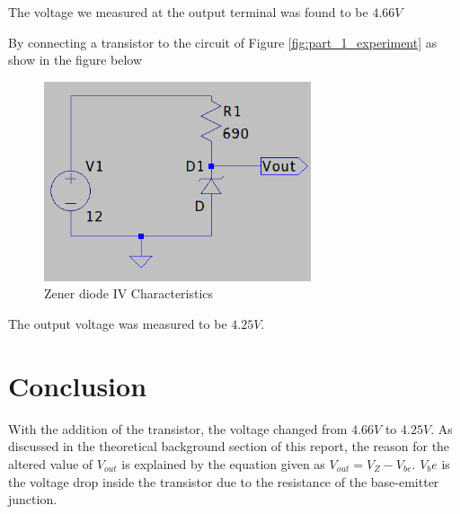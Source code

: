 \documentclass[12pt, a4paper]{article}
\begin{document}
		The voltage we measured at the output terminal was found to be $4.66V$

		By connecting a transistor to the circuit of Figure \ref{fig:part_1_experiment} as show in the figure below 

		\begin{figure}[H]
			\centering
			\includegraphics[width=0.7\textwidth]{Images/Part_2_Experiment.png}
			\caption{Zener diode IV Characteristics}
			\label{fig:part_2_experiment}
		\end{figure}

		The output voltage was measured to be $4.25V$. 
	

	\section{Conclusion} %
	\label{sec:conclusion}
		With the addition of the transistor, the voltage changed from $4.66V$ to $4.25V$. As discussed in the theoretical background section of this report, the reason for the altered value of $V_{out}$ is explained by the equation given as $V_{out} = V_Z - V_{be}$. $V_be$ is the voltage drop inside the transistor due to the resistance of the base-emitter junction.
	
\end{document}

